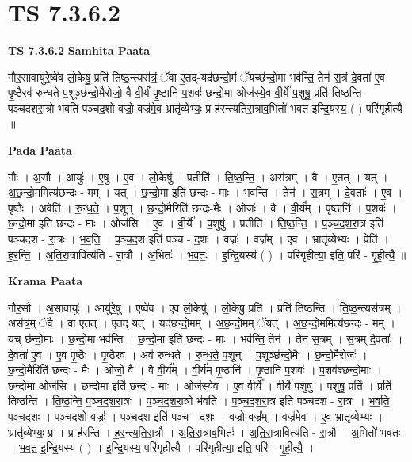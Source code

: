 \documentclass[17pt]{extarticle}
\begin{document}
\section{ TS 7.3.6.2 }

\textbf{TS 7.3.6.2 } \newline
\textbf{Samhita Paata} \newline

गौर॒सावायु॑रे॒ष्वे॑व लो॒केषु॒ प्रति॑ तिष्ठ॒न्त्यस॑त्रं॒ ॅवा ए॒तद्-यद॑छन्दो॒मं ॅयच्छ॑न्दो॒मा भव॑न्ति॒ तेन॑ स॒त्रं दे॒वता॑ ए॒व पृ॒ष्ठैरव॑ रुन्धते प॒शूञ्छ॑न्दो॒मैरोजो॒ वै वी॒र्यं॑ पृ॒ष्ठानि॑ प॒शवः॑ छन्दो॒मा ओज॑स्ये॒व वी॒र्ये॑ प॒शुषु॒ प्रति॑ तिष्ठन्ति पञ्चदशरा॒त्रो भ॑वति पञ्चद॒शो वज्रो॒ वज्र॑मे॒व भ्रातृ॑व्येभ्यः॒ प्र ह॑रन्त्यतिरा॒त्राव॒भितो॑ भवत इन्द्रि॒यस्य॒ ( ) परि॑गृहीत्यै ॥ \newline

\textbf{Pada Paata} \newline

गौः । अ॒सौ । आयुः॑ । ए॒षु । ए॒व । लो॒केषु॑ । प्रतीति॑ । ति॒ष्ठ॒न्ति॒ । अस॑त्रम् । वै । ए॒तत् । यत् । अ॒छ॒न्दो॒ममित्य॑छन्दः - मम् । यत् । छ॒न्दो॒मा इति॑ छन्दः - माः । भव॑न्ति । तेन॑ । स॒त्रम् । दे॒वताः᳚ । ए॒व । पृ॒ष्ठैः । अवेति॑ । रु॒न्ध॒ते॒ । प॒शून् । छ॒न्दो॒मैरिति॑ छन्दः-मैः । ओजः॑ । वै । वी॒र्य᳚म् । पृ॒ष्ठानि॑ । प॒शवः॑ । छ॒न्दो॒मा इति॑ छन्दः - माः । ओज॑सि । ए॒व । वी॒र्ये᳚ । प॒शुषु॑ । प्रतीति॑ । ति॒ष्ठ॒न्ति॒ । प॒ञ्च॒द॒श॒रा॒त्र इति॑ पञ्चदश - रा॒त्रः । भ॒व॒ति॒ । प॒ञ्च॒द॒श इति॑ पञ्च - द॒शः । वज्रः॑ । वज्र᳚म् । ए॒व । भ्रातृ॑व्येभ्यः । प्रेति॑ । ह॒र॒न्ति॒ । अ॒ति॒रा॒त्रावित्य॑ति - रा॒त्रौ । अ॒भितः॑ । भ॒व॒तः॒ । इ॒न्द्रि॒यस्य॑ ( ) । परि॑गृहीत्या॒ इति॒ परि॑ - गृ॒ही॒त्यै॒ ॥  \newline


\textbf{Krama Paata} \newline

गौर॒सौ । अ॒सावायुः॑ । आयु॑रे॒षु । ए॒ष्वे॑व । ए॒व लो॒केषु॑ । लो॒केषु॒ प्रति॑ । प्रति॑ तिष्ठन्ति । ति॒ष्ठ॒न्त्यस॑त्रम् । अस॑त्र॒म् ॅवै । वा ए॒तत् । ए॒तद् यत् । यद॑छन्दो॒मम् । अ॒छ॒न्दो॒मम् ॅयत् । अ॒छ॒न्दो॒ममित्य॑छन्दः - मम् । यच् छ॑न्दो॒माः । छ॒न्दो॒मा भव॑न्ति । छ॒न्दो॒मा इति॑ छन्दः - माः । भव॑न्ति॒ तेन॑ । तेन॑ स॒त्रम् । स॒त्रम् दे॒वताः᳚ । दे॒वता॑ ए॒व । ए॒व पृ॒ष्ठैः । पृ॒ष्ठैरव॑ । अव॑ रुन्धते । रु॒न्ध॒ते॒ प॒शून् । प॒शूञ्छ॑न्दो॒मैः । छ॒न्दो॒मैरोजः॑ । छ॒न्दो॒मैरिति॑ छन्दः - मैः । ओजो॒ वै । वै वी॒र्य᳚म् । वी॒र्य॑म् पृ॒ष्ठानि॑ । पृ॒ष्ठानि॑ प॒शवः॑ । प॒शव॑श्छन्दो॒माः । छ॒न्दो॒मा ओज॑सि । छ॒न्दो॒मा इति॑ छन्दः - माः । ओज॑स्ये॒व । ए॒व वी॒र्ये᳚ । वी॒र्ये॑ प॒शुषु॑ । प॒शुषु॒ प्रति॑ । प्रति॑ तिष्ठन्ति । ति॒ष्ठ॒न्ति॒ प॒ञ्च॒द॒श॒रा॒त्रः । प॒ञ्च॒द॒श॒रा॒त्रो भ॑वति । प॒ञ्च॒द॒श॒रा॒त्र इति॑ पञ्चदश - रा॒त्रः । भ॒व॒ति॒ प॒ञ्च॒द॒शः । प॒ञ्च॒द॒शो वज्रः॑ । प॒ञ्च॒द॒श इति॑ पञ्च - द॒शः । वज्रो॒ वज्र᳚म् । वज्र॑मे॒व । ए॒व भ्रातृ॑व्येभ्यः । भ्रातृ॑व्येभ्यः॒ प्र । प्र ह॑रन्ति । ह॒र॒न्त्य॒ति॒रा॒त्रौ । अ॒ति॒रा॒त्राव॒भितः॑ । अ॒ति॒रा॒त्रावित्य॑ति - रा॒त्रौ । अ॒भितो॑ भवतः । भ॒व॒त॒ इ॒न्द्रि॒यस्य॑ ( ) । इ॒न्द्रि॒यस्य॒ परि॑गृहीत्यै । परि॑गृहीत्या॒ इति॒ परि॑ - गृ॒ही॒त्यै॒ । \newline
\end{document}
